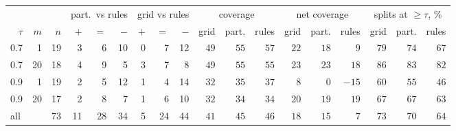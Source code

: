 \begin{tabular}{rrr rrr rrr rrr rrr rrr}
\toprule
& & & \multicolumn{3}{c}{part.\ vs rules} & \multicolumn{3}{c}{grid vs rules} & \multicolumn{3}{c}{coverage} & \multicolumn{3}{c}{net coverage} & \multicolumn{3}{c}{splits at $\ge\tau$, \%}\\
\cmidrule(lr){4-6}\cmidrule(lr){7-9}\cmidrule(lr){10-12}\cmidrule(lr){13-15}\cmidrule(lr){16-18}
$\tau$ & $m$ & $n$ & $+$ & $=$ & $-$ & $+$ & $=$ & $-$ & grid & part. & rules & grid & part. & rules & grid & part. & rules\\
\midrule
0.7 & 1 & 19 & 3 & 6 & 10 & 0 & 7 & 12 & $49$ & $55$ & $57$ & $22$ & $18$ & $9$ & $79$ & $74$ & $67$\\
0.7 & 20 & 18 & 4 & 9 & 5 & 3 & 7 & 8 & $49$ & $55$ & $55$ & $23$ & $23$ & $18$ & $86$ & $83$ & $82$\\
0.9 & 1 & 19 & 2 & 5 & 12 & 1 & 4 & 14 & $32$ & $35$ & $37$ & $8$ & $0$ & $-15$ & $60$ & $55$ & $46$\\
0.9 & 20 & 17 & 2 & 8 & 7 & 1 & 6 & 10 & $32$ & $34$ & $34$ & $20$ & $19$ & $19$ & $67$ & $67$ & $63$\\
\midrule
\multicolumn{2}{l}{all} & 73 & 11 & 28 & 34 & 5 & 24 & 44 & $41$ & $45$ & $46$ & $18$ & $15$ & $7$ & $73$ & $70$ & $64$\\
\bottomrule
\end{tabular}
